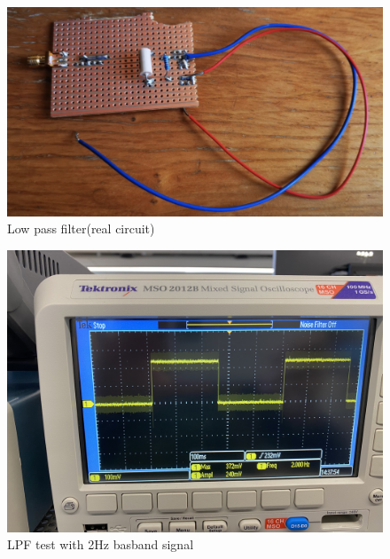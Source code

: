 \documentclass[12pt,a4paper]{report}
\begin{document}
\begin{figure}[H]
    \centerline{\includegraphics[scale=0.5]{rectifier.png}}
    \caption{Low pass filter(real circuit)}
    \label{RealLPF}
\end{figure}

\begin{figure}[H]
    \centerline{\includegraphics[scale=0.1]{LPFTest2Hz.PNG}}
    \caption{LPF test with 2Hz basband signal}
    \label{fig:LPF2}
\end{figure}
\end{document}
